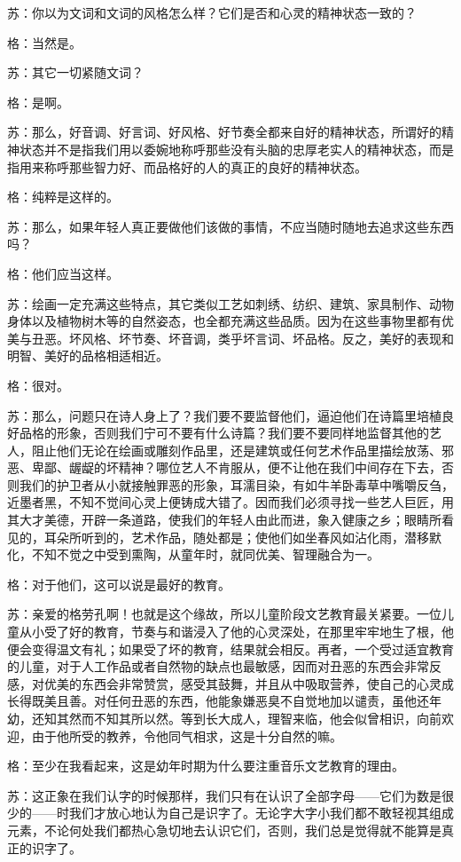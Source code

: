 \documentclass[11pt,oneside]{book}
\begin{document}
\begin{common-format}
苏：你以为文词和文词的风格怎么样？它们是否和心灵的精神状态一致的？

格：当然是。

苏：其它一切紧随文词？

格：是啊。

苏：那么，好音调、好言词、好风格、好节奏全都来自好的精神状态，所谓好的精神状态并不是指我们用以委婉地称呼那些没有头脑的忠厚老实人的精神状态，而是指用来称呼那些智力好、而品格好的人的真正的良好的精神状态。

格：纯粹是这样的。

苏：那么，如果年轻人真正要做他们该做的事情，不应当随时随地去追求这些东西吗？

格：他们应当这样。

苏：绘画一定充满这些特点，其它类似工艺如刺绣、纺织、建筑、家具制作、动物身体以及植物树木等的自然姿态，也全都充满这些品质。因为在这些事物里都有优美与丑恶。坏风格、坏节奏、坏音调，类乎坏言词、坏品格。反之，美好的表现和明智、美好的品格相适相近。

格：很对。

苏：那么，问题只在诗人身上了？我们要不要监督他们，逼迫他们在诗篇里培植良好品格的形象，否则我们宁可不要有什么诗篇？我们要不要同样地监督其他的艺人，阻止他们无论在绘画或雕刻作品里，还是建筑或任何艺术作品里描绘放荡、邪恶、卑鄙、龌龊的坏精神？哪位艺人不肯服从，便不让他在我们中间存在下去，否则我们的护卫者从小就接触罪恶的形象，耳濡目染，有如牛羊卧毒草中嘴嚼反刍，近墨者黑，不知不觉间心灵上便铸成大错了。因而我们必须寻找一些艺人巨匠，用其大才美德，开辟一条道路，使我们的年轻人由此而进，象入健康之乡；眼睛所看见的，耳朵所听到的，艺术作品，随处都是；使他们如坐春风如沾化雨，潜移默化，不知不觉之中受到熏陶，从童年时，就同优美、智理融合为一。

格：对于他们，这可以说是最好的教育。

苏：亲爱的格劳孔啊！也就是这个缘故，所以儿童阶段文艺教育最关紧要。一位儿童从小受了好的教育，节奏与和谐浸入了他的心灵深处，在那里牢牢地生了根，他便会变得温文有礼；如果受了坏的教育，结果就会相反。再者，一个受过适宜教育的儿童，对于人工作品或者自然物的缺点也最敏感，因而对丑恶的东西会非常反感，对优美的东西会非常赞赏，感受其鼓舞，并且从中吸取营养，使自己的心灵成长得既美且善。对任何丑恶的东西，他能象嫌恶臭不自觉地加以谴责，虽他还年幼，还知其然而不知其所以然。等到长大成人，理智来临，他会似曾相识，向前欢迎，由于他所受的教养，令他同气相求，这是十分自然的嘛。

格：至少在我看起来，这是幼年时期为什么要注重音乐文艺教育的理由。

苏：这正象在我们认字的时候那样，我们只有在认识了全部字母——它们为数是很少的——时我们才放心地认为自己是识字了。无论字大字小我们都不敢轻视其组成元素，不论何处我们都热心急切地去认识它们，否则，我们总是觉得就不能算是真正的识字了。


\end{common-format}
\end{document}
